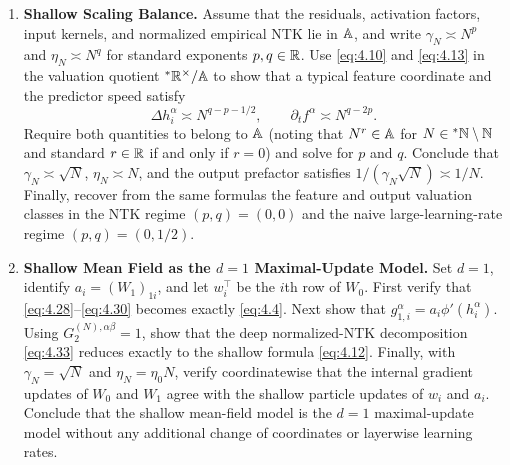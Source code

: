 \begin{enumerate}
\item \textbf{Shallow Scaling Balance.} Assume that the residuals, activation factors, input kernels, and normalized empirical NTK lie in $\mathbb{A}$, and write $\gamma_N \asymp N^p$ and $\eta_N \asymp N^q$ for standard exponents $p, q \in \mathbb{R}$. Use \eqref{eq:4.10} and \eqref{eq:4.13} in the valuation quotient ${}^*\mathbb{R}^\times / \mathbb{A}$ to show that a typical feature coordinate and the predictor speed satisfy
\begin{equation}\label{eq:4.66}
\Delta h_i^\alpha \asymp N^{q - p - 1/2}, \qquad \partial_t f^\alpha \asymp N^{q - 2p}.
\end{equation}
Require both quantities to belong to $\mathbb{A}$ (noting that $N^r \in \mathbb{A}$ for $N \in {}^*\mathbb{N} \setminus \mathbb{N}$ and standard $r \in \mathbb{R}$ if and only if $r = 0$) and solve for $p$ and $q$. Conclude that $\gamma_N \asymp \sqrt{N}$, $\eta_N \asymp N$, and the output prefactor satisfies $1/(\gamma_N\sqrt{N}) \asymp 1/N$. Finally, recover from the same formulas the feature and output valuation classes in the NTK regime $(p, q) = (0, 0)$ and the naive large-learning-rate regime $(p, q) = (0, 1/2)$.

\item \textbf{Shallow Mean Field as the $d = 1$ Maximal-Update Model.} Set $d = 1$, identify $a_i = (W_1)_{1i}$, and let $w_i^\top$ be the $i$th row of $W_0$. First verify that \eqref{eq:4.28}--\eqref{eq:4.30} becomes exactly \eqref{eq:4.4}. Next show that $g_{1, i}^\alpha = a_i \phi'(h_i^\alpha)$. Using $G_2^{(N),\alpha\beta} = 1$, show that the deep normalized-NTK decomposition \eqref{eq:4.33} reduces exactly to the shallow formula \eqref{eq:4.12}. Finally, with $\gamma_N = \sqrt{N}$ and $\eta_N = \eta_0 N$, verify coordinatewise that the internal gradient updates of $W_0$ and $W_1$ agree with the shallow particle updates of $w_i$ and $a_i$. Conclude that the shallow mean-field model is the $d = 1$ maximal-update model without any additional change of coordinates or layerwise learning rates.


\end{enumerate}

